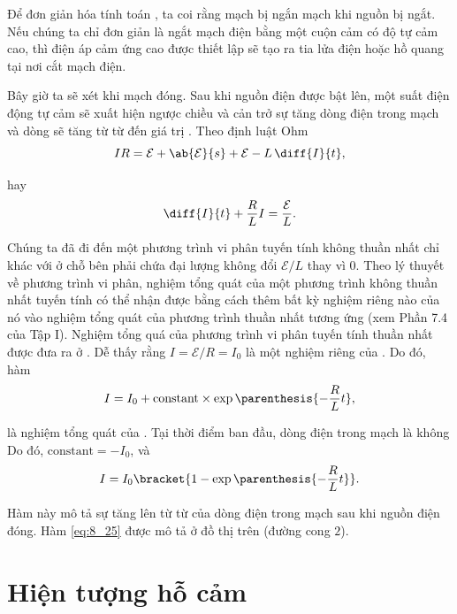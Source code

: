 Để đơn giản hóa tính toán , ta coi rằng mạch bị ngắn mạch khi nguồn bị ngắt.
Nếu chúng ta chỉ đơn giản là ngắt mạch điện bằng một cuộn cảm có độ tự cảm cao, thì điện áp cảm ứng cao được thiết lập sẽ tạo ra tia lửa điện hoặc hồ quang tại nơi cắt mạch điện.

Bây giờ ta sẽ xét khi mạch đóng.
Sau khi nguồn điện được bật lên, một suất điện động tự cảm sẽ xuất hiện ngược chiều và cản trở sự tăng dòng điện trong mạch và dòng sẽ tăng từ từ đến giá trị .
Theo định luật Ohm
\begin{equation*}
	IR = \mathcal{E} + \ab{\mathcal{E}}{s} + \mathcal{E} - L\, \diff{I}{t},
\end{equation*}

\noindent
hay
\begin{equation}\label{eq:8_24}
	\diff{I}{t} + \frac{R}{L} I = \frac{\mathcal{E}}{L}.
\end{equation}

Chúng ta đã đi đến một phương trình vi phân tuyến tính không thuần nhất chỉ khác với  ở chỗ bên phải chứa đại lượng không đổi $\mathcal{E}/L$ thay vì 0.
Theo lý thuyết về phương trình vi phân, nghiệm tổng quát của một phương trình không thuần nhất tuyến tính có thể nhận được bằng cách thêm bất kỳ nghiệm riêng nào của nó vào nghiệm tổng quát của phương trình thuần nhất tương ứng (xem Phần 7.4 của Tập I).
Nghiệm tổng quá của phương trình vi phân tuyến tính thuần nhất được đưa ra ở .
Dễ thấy rằng $I=\mathcal{E}/R=I_0$ là một nghiệm riêng của .
Do đó, hàm
\begin{equation*}
	I = I_0 + \text{constant} \times \exp\parenthesis{- \frac{R}{L} t},
\end{equation*}

\noindent
là nghiệm tổng quát của .
Tại thời điểm ban đầu, dòng điện trong mạch là không
Do đó, $\text{constant}=-I_0$, và
\begin{equation}\label{eq:8_25}
	I = I_0 \bracket{1 - \exp\parenthesis{ -\frac{R}{L} t}}.
\end{equation}

\noindent
Hàm này mô tả sự tăng lên từ từ của dòng điện trong mạch sau khi nguồn điện đóng. 
Hàm \eqref{eq:8_25} được mô tả ở đồ thị trên  (đường cong $2$).

\section{Hiện tượng hỗ cảm}\label{sec:8_7}

